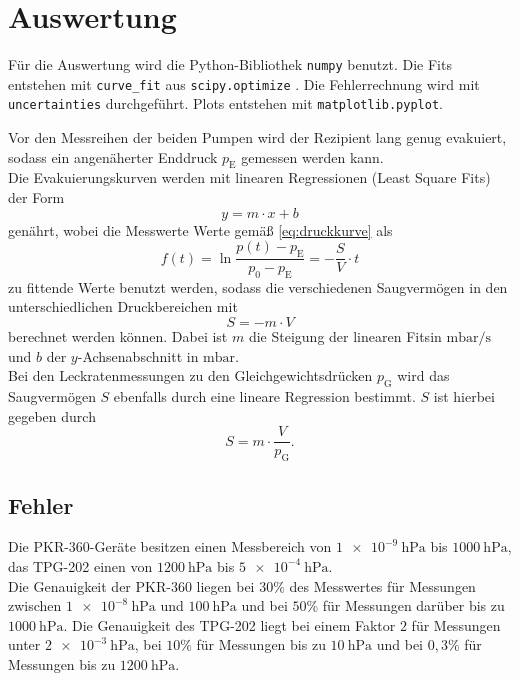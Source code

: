 \section{Auswertung}
\label{sec:Auswertung}

Für die Auswertung wird die Python-Bibliothek \texttt{numpy} \cite{numpy} benutzt. Die Fits entstehen mit \texttt{curve\_fit} aus \texttt{scipy.optimize} \cite{scipy}.
Die Fehlerrechnung wird mit \texttt{uncertainties} \cite{uncertainties} durchgeführt. Plots entstehen mit \texttt{matplotlib.pyplot}.

Vor den Messreihen der beiden Pumpen wird der Rezipient lang genug evakuiert, sodass ein angenäherter Enddruck $p_\text{E}$ gemessen werden kann. \\
Die Evakuierungskurven werden mit linearen Regressionen (Least Square Fits) der Form
\begin{equation}
    y = m \cdot x + b
\end{equation}
genährt, wobei die Messwerte Werte gemäß \eqref{eq:druckkurve} als
\begin{equation}
    f(t) = \ln{\frac{p(t) - p_\text{E}}{p_0 - p_\text{E}}} = -\frac{S}{V} \cdot t
    \label{eq:linfit}
\end{equation}
zu fittende Werte benutzt werden, sodass die verschiedenen Saugvermögen in den unterschiedlichen Druckbereichen mit
\begin{equation}
    S = -m \cdot V
    \label{eq:S_evak}
\end{equation}
berechnet werden können. Dabei ist $m$ die Steigung der linearen Fitsin $\si{\milli\bar\per\second}$ und $b$ der $y$-Achsenabschnitt in $\si{\milli\bar}$.\\
Bei den Leckratenmessungen zu den Gleichgewichtsdrücken $p_\text{G}$ wird das Saugvermögen $S$ ebenfalls durch eine lineare Regression bestimmt.
$S$ ist hierbei gegeben durch
\begin{equation}
    S = m \cdot \frac{V}{p_\text{G}}.
    \label{eq:S_leck}
\end{equation}

\subsection{Fehler}

Die PKR-360-Geräte besitzen einen Messbereich von $\qty{1e-9}{\hecto\pascal}$ bis $\qty{1000}{\hecto\pascal}$,
das TPG-202 einen von $\qty{1200}{\hecto\pascal}$ bis $\qty{5e-4}{\hecto\pascal}$.\\
Die Genauigkeit der PKR-360 liegen bei $30 \%$ des Messwertes für Messungen zwischen $\qty{1e-8}{\hecto\pascal}$ und $\qty{100}{\hecto\pascal}$
und bei $50 \%$ für Messungen darüber bis zu $\qty{1000}{\hecto\pascal}$.
Die Genauigkeit des TPG-202 liegt bei einem Faktor $2$ für Messungen unter $\qty{2e-3}{\hecto\pascal}$, bei $10 \%$ für Messungen bis zu $\qty{10}{\hecto\pascal}$
und bei $0,3 \%$ für Messungen bis zu $\qty{1200}{\hecto\pascal}$. \cite{delta_tu_dortmund}


